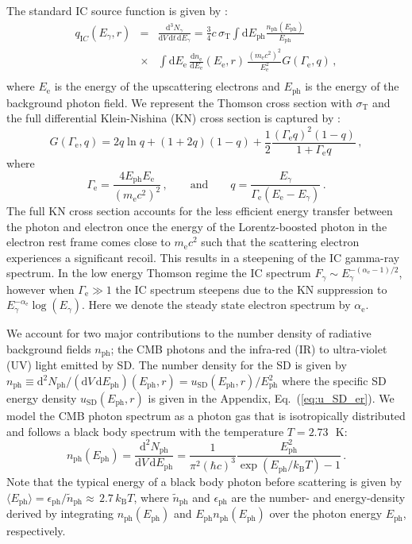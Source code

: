 \documentclass[10pt,aps,pra,reprint,amsmath,amsfonts,amssymb,showpacs,nofootinbib,floatfix]{revtex4-1}
\newcommand{\rmn}{\mathrm}
\newcommand{\ph}{\rmn{ph}}
\newcommand{\eph}{E_\ph}
\newcommand{\sd}{\rmn{SD}}
\newcommand{\ee}{E_\rmn{e}}
\newcommand{\B}{\rmn{B}}
\newcommand{\dd}{\rmn{d}}
\newcommand{\e}{\rmn{e}}
\newcommand{\eg}{E_\gamma}
\begin{document}
The standard IC source function is given by
\cite{1979rpa..book.....R}:
\begin{eqnarray}
  q_{\rmn IC}(\eg, r) &=&  \frac{\dd^3 N_\gamma}{\dd V\,\dd t\,\dd \eg} = 
 \frac{3}{4}c\,\sigma_\rmn{T}
\int\dd \eph \frac{n_\rmn{ph}(\eph)}{\eph}\nonumber\\
&\times& \int \dd \ee\,\frac{\dd n_\e}{\dd \ee}(\ee,r)\,
 \frac{\left(m_\e c^2\right)^2}{\ee^2}G(\Gamma_\e,q)\,,\nonumber\\
  \label{eq:ICemiss}
\end{eqnarray}
where $\ee$ is the energy of the upscattering electrons and $\eph$ is
the energy of the background photon field. We represent the Thomson
cross section with $\sigma_\rmn{T}$ and the full differential
Klein-Nishina (KN) cross section is captured by
\cite{1970RvMP...42..237B}:
\begin{equation}
\label{eq:KN_spec}
G(\Gamma_\e,q) = 2q\ln{q}+(1+2q)(1-q)+ 
\frac{1}{2}\frac{\left(\Gamma_\e q\right)^2\left(1-q\right)}
     {1+\Gamma_\e q}\,,
\end{equation}
where
\begin{equation}
\Gamma_\e=\frac{4\eph \ee}{\left(m_\e c^2\right)^2}\,,\qquad \rmn{and} \qquad  
q=\frac{\eg}{\Gamma_\e\left(\ee-\eg\right)}\,.
\end{equation}
The full KN cross section accounts for the less efficient energy
transfer between the photon and electron once the energy of the
Lorentz-boosted photon in the electron rest frame comes close to $m_\e
c^2$ such that the scattering electron experiences a significant
recoil. This results in a steepening of the IC gamma-ray spectrum. In
the low energy Thomson regime the IC spectrum $F_\gamma\sim
E_\gamma^{-(\alpha_\e-1)/2}$, however when $\Gamma_\e \gg 1$ the IC
spectrum steepens due to the KN suppression to
$\eg^{-\alpha_\e}\log(\eg)$. Here we denote the steady state electron
spectrum by $\alpha_\e$.

We account for two major contributions to the number density of
radiative background fields $n_\ph$; the CMB photons and the infra-red
(IR) to ultra-violet (UV) light emitted by SD. The number density for
the SD is given by $n_\ph\equiv\dd^2 N_\ph/ (\dd V \,\dd \eph)
(\eph,r)= u_\sd(\eph,r) /\eph^2$ where the specific SD energy
density $u_\sd(\eph,r)$ is given in the Appendix,
Eq.~(\ref{eq:u_SD_er}). We model the CMB photon spectrum as a photon
gas that is isotropically distributed and follows a black body
spectrum with the temperature $T=2.73\,$~K:
\begin{equation}
\label{eq:photon_gas}
  n_\rmn{ph}(\eph) = \frac{\dd^2 N_\ph}{\dd V \,\dd \eph} =
  \frac{1}{\pi^2(\hbar c)^3}\frac{\eph^2}{\exp(\eph/k_\B T)-1}\,.
\end{equation}
Note that the typical energy of a black body photon before scattering
is given by $\langle\eph\rangle=\epsilon_\ph/\tilde{n}_\ph\approx\,2.7\, k_\B T$,
where $\tilde{n}_\ph$ and $\epsilon_\ph$ are the number- and
energy-density derived by integrating $n_\ph(\eph)$ and $\eph
n_\ph(\eph)$ over the photon energy $\eph$, respectively.
\end{document}
